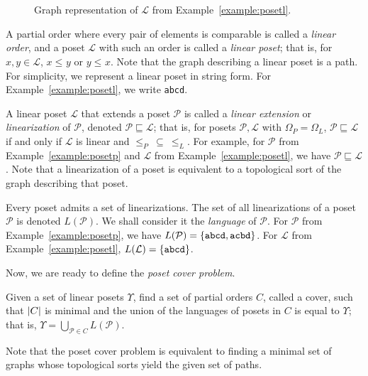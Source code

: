 \documentclass{llncs}
\DeclarePairedDelimiter{\set}{\{}{\}}
\DeclarePairedDelimiter{\abs}{\lvert}{\rvert}
\let\oldleq\leq
\renewcommand{\leq}[1][]{\oldleq_{#1}}
\newcommand{\poset}[1]{\mathcal{#1}}
\newcommand{\uni}[1][]{\Omega_{#1}}
\newcommand{\lang}[1]{L(#1)}
\newcommand{\lin}[1]{\texttt{#1}}
\newcommand{\lext}{\sqsubseteq}
\begin{document}
\begin{figure}[h]
    \centering
    \caption{Graph representation of $\poset{L}$ from Example~\ref{example:posetl}.}
    \label{figure:posetl}
\end{figure}

A partial order where every pair of elements is comparable is called a \emph{linear order}, and a poset $\poset{L}$ with such an order is called a \emph{linear poset}; that is, for $x, y \!\in\! \poset{L}$, $x \leq y$ or $y \leq x$. Note that the graph describing a linear poset is a path. For simplicity, we represent a linear poset in string form. For Example~\ref{example:posetl}, we write \lin{abcd}.

A linear poset $\poset{L}$ that extends a poset $\poset{P}$ is called a \emph{linear extension} or \emph{linearization} of $\poset{P}$, denoted $\poset{P} \lext \poset{L}$; that is, for posets $\poset{P},\poset{L}$ with $\uni[P] \!=\! \uni[L]$, $\poset{P} \lext \poset{L}$ if and only if $\poset{L}$ is linear and $\leq[P] \>\subseteq\> \leq[L]$. For example, for $\poset{P}$ from Example~\ref{example:posetp} and $\poset{L}$ from Example~\ref{example:posetl}, we have $\poset{P} \lext \poset{L}$. Note that a linearization of a poset is equivalent to a topological sort of the graph describing that poset.

Every poset admits a set of linearizations. The set of all linearizations of a poset $\poset{P}$ is denoted $\lang{\poset{P}}$. We shall consider it the \emph{language} of $\poset{P}$. For $\poset{P}$ from Example~\ref{example:posetp}, we have $\lang{\poset{P}} = \set{\lin{abcd},\lin{acbd}}$. For $\poset{L}$ from Example~\ref{example:posetl}, $\lang{\poset{L}} = \set{\lin{abcd}}$.

Now, we are ready to define the \emph{poset cover problem}.

\begin{definition}
    Given a set of linear posets $\Upsilon$, find a set of partial orders $C$, called a cover, such that $\abs{C}$ is minimal and the union of the languages of posets in $C$ is equal to $\Upsilon$; that is, $\Upsilon = \bigcup_{\poset{P} \in C} \lang{\poset{P}}$.

    Note that the poset cover problem is equivalent to finding a minimal set of graphs whose topological sorts yield the given set of paths.
    \label{definition:pcp}
\end{definition}
\end{document}
